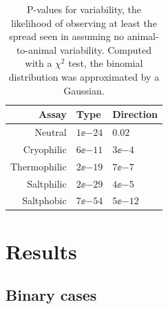 \documentclass[12pt]{article}
\begin{document}
\begin{table}
  \begin{center}
    \begin{tabular}{|r|l|l|}
      \hline
      Assay & Type & Direction \\
    \hline
     Neutral      & $1\ee{-24}$ & $0.02$  \\
     Cryophilic   & $6\ee{-11}$ & $3\ee{-4}$  \\
     Thermophilic & $2\ee{-19}$ & $7\ee{-7}$ \\
     Saltphilic   & $2\ee{-29}$ & $4\ee{-5}$ \\
     Saltphobic   & $7\ee{-54}$ & $5\ee{-12}$ \\
     \hline
    \end{tabular}
  \end{center}
  \caption[P-values for variability]{P-values for variability, \ie the likelihood of observing at least the spread seen in  assuming no animal-to-animal variability. Computed with a $\chi^2$ test, \ie the binomial distribution was approximated by a Gaussian.}\label{tab:varipval}
\end{table}



\section{Results}\label{sec:results}


\subsection{Binary cases}\label{sec:binaryresults}
\end{document}
